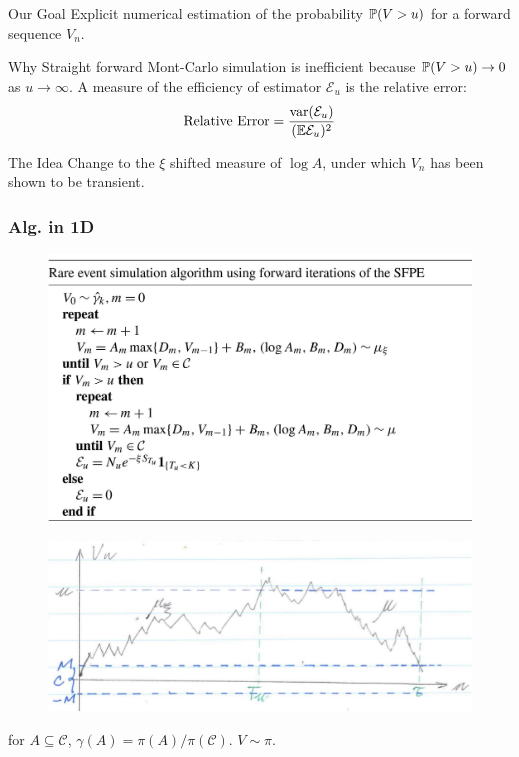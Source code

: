 \documentclass{beamer}
\begin{document}
\begin{frame}
  \begin{exampleblock}{Our Goal}
    Explicit numerical estimation of the probability $\P(V > u)$ for a
    forward sequence $V_n$.
  \end{exampleblock}
  \begin{exampleblock}{Why}
    Straight forward Mont-Carlo simulation is inefficient because
    $\P(V > u) \to 0$ as $u \to \infty$. A measure of the efficiency
    of estimator $\mathcal E_u$ is the relative error:
    \[
    \text{Relative Error} = {
      \var(\mathcal E_u)
      \over
      (\E \mathcal E_u)^2
    }
    \]
  \end{exampleblock}
  \begin{exampleblock}{The Idea}
    Change to the $\xi$ shifted measure of $\log A$, under which $V_n$ has
    been shown to be transient.
  \end{exampleblock}
\end{frame}

\begin{frame}
  
\end{frame}

\begin{frame}
  \frametitle{Alg. in 1D}
  \begin{figure}[htb!]
    \centering
    \includegraphics[scale=0.14]{IMG_1091.jpg}
  \end{figure}
\end{frame}

\begin{frame}
  \begin{figure}[htb!]
    \centering
    \includegraphics[scale=0.5]{pic1.pdf}
  \end{figure}
  for $A \subseteq \mathcal C$, $\gamma(A) = \pi(A)/\pi(\mathcal
  C)$. $V \sim \pi$.
\end{frame}
\end{document}
